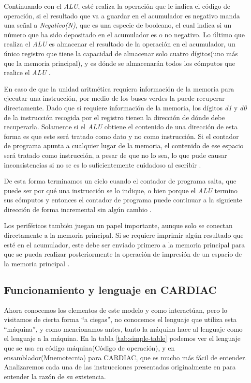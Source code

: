 \documentclass[letterpaper,12pt,oneside]{book}
\begin{document}
	Continuando con el \textit{ALU}, esté realiza la operación que le indica el código de operación, si el resultado que va a guardar
	en el acumulador es negativo manda una señal a \textit{Negativo(N)}, que es una especie de booleano, el cual indica si un número 
	que ha sido depositado en el acumulador es
	o no negativo. Lo último que realiza el \textit{ALU} es almacenar el resultado de la operación en el  acumulador, un único registro
	que tiene la capacidad de almacenar solo cuatro dígitos(uno más que la memoria principal), y es dónde se almacenarán todos
	los cómputos que realice el \textit{ALU} \cite{fingerman_instruction_1968}. 
	
	En caso de que la unidad aritmética requiera información
	de la memoria  para ejecutar una instrucción, por medio de los buses verdes la puede recuperar directamente. Dado que si requiere información
	de la memoria, los dígitos \textit{d1} y \textit{d0} de la instrucción recogida por el registro tienen la dirección de dónde debe recuperarla.  Solamente
	si el \textit{ALU} obtiene el contenido de una dirección de esta forma es que este será tratado como dato y no como instrucción. Si el contador de programa apunta a cualquier lugar de la memoria, el contenido de ese espacio será tratado como instrucción, a pesar
	de que no lo sea, lo que pude causar inconsistencias si no se es lo suficientemente cuidadoso al escribir \cite{fingerman_instruction_1968}.
	
	De esta forma terminamos un ciclo cuando el contador de programa salta, que puede ser por qué una instrucción se lo indique, o bien porque
	el \textit{ALU} termino sus cómputos y entonces el contador de programa puede continuar a la siguiente dirección de forma incremental
	sin algún cambio \cite{fingerman_instruction_1968}.
	
	Los periféricos también juegan un papel importante, aunque solo se conectan directamente a la memoria principal. Si se requiere imprimir algún resultado que esté en el acumulador, este debe ser enviado primero
	a la memoria principal para que se pueda realizar posteriormente la operación de impresión de un espacio de la memoria principal 
	\cite{fingerman_instruction_1968}.
	
	\subsection{Funcionamiento y lenguaje en CARDIAC}	
	
	Ahora conocemos los elementos de este modelo y como interactúan, pero lo visitamos de cierta forma ``a ciegas'', no conocemos el lenguaje
	que utiliza esta ``máquina'', y como mencionamos antes, tanto la máquina hace al lenguaje como el lenguaje a la máquina. En la tabla \ref{tab:simple-table} podemos ver el lenguaje que se usa en código máquina(Código de operación), y 
	en 	ensamblador(Mnemotecnia) para CARDIAC, que es mucho más fácil de entender. Analizaremos cada una de las instrucciones presentadas
	originalmente en \cite{fingerman_instruction_1968} para entender la razón de su 
	existencia.
	
\end{document}
